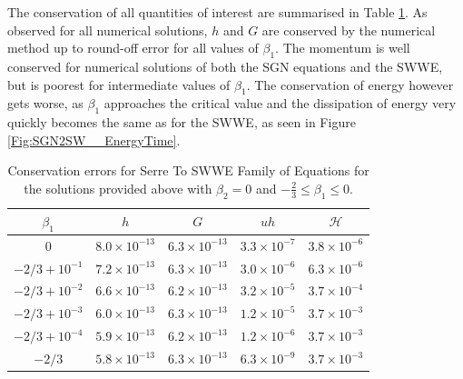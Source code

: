 \documentclass[10pt]{elsarticle}
\newcommand\T{\rule{0pt}{3ex }}       %
\begin{document}
The conservation of all quantities of interest are summarised in Table \ref{Tab:SGN2SW_Cons}. As observed for all numerical solutions, $h$ and $G$ are conserved by the numerical method up to round-off error for all values of $\beta_1$. The momentum is well conserved for numerical solutions of both the SGN equations and the SWWE, but is poorest for intermediate values of $\beta_1$. The conservation of energy however gets worse, as $\beta_1$ approaches the critical value and the dissipation of energy very quickly becomes the same as for the SWWE, as seen in Figure \ref{Fig:SGN2SW__EnergyTime}. 
%
\begin{table}
	\centering
	\begin{tabular}{ c | c | c | c | c }
		$\beta_1$ & $h$ & $G$ & $uh$ & $\mathcal{H}$  \\
		\hline
		\T $0$ &	$8.0 \times 10^{-13}$ &	$6.3 \times 10^{-13}$ & $3.3 \times 10^{-7}$ & $3.8 \times 10^{-6}$ \\
		\T $-{2}/{3} + 10^{-1}$ &	$7.2 \times 10^{-13}$ &	$6.3 \times 10^{-13}$ & $3.0 \times 10^{-6}$ & $6.3 \times 10^{-6}$ \\
		\T $-{2}/{3} + 10^{-2}$ &	$6.6 \times 10^{-13}$ &	$6.2 \times 10^{-13}$ & $3.2 \times 10^{-5}$ & $3.7 \times 10^{-4}$ \\		
		\T $-{2}/{3} + 10^{-3}$ &	$6.0 \times 10^{-13}$ &	$6.3 \times 10^{-13}$ & $1.2 \times 10^{-5}$ & $3.7 \times 10^{-3}$ \\	
		\T $-{2}/{3} + 10^{-4}$ &	$5.9 \times 10^{-13}$ &	$6.2 \times 10^{-13}$ & $1.2 \times 10^{-6}$ & $3.7 \times 10^{-3}$ \\
		\T $-{2}/{3} $ &	$5.8 \times 10^{-13}$ & $6.3 \times 10^{-13}$  & $6.3 \times 10^{-9}$ &	 $3.7 \times 10^{-3}$ \\		
	\end{tabular}
	\caption{Conservation errors for Serre To SWWE Family of Equations for the solutions provided above with $\beta_2 = 0$ and $-\frac{2}{3}\le \beta_1 \le 0$.}
	\label{Tab:SGN2SW_Cons}
\end{table}
%
\end{document}

